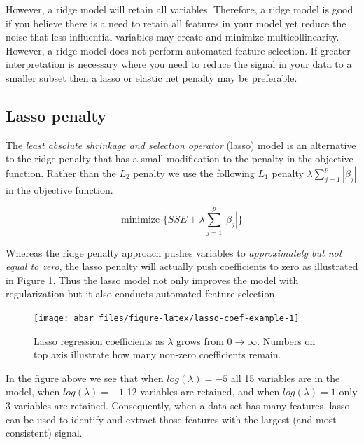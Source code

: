 \documentclass[]{book}
\theoremstyle{definition}
\theoremstyle{definition}
\theoremstyle{definition}
\theoremstyle{remark}
\begin{document}
However, a ridge model will retain all variables. Therefore, a ridge
model is good if you believe there is a need to retain all features in
your model yet reduce the noise that less influential variables may
create and minimize multicollinearity. However, a ridge model does not
perform automated feature selection. If greater interpretation is
necessary where you need to reduce the signal in your data to a smaller
subset then a lasso or elastic net penalty may be preferable.

\hypertarget{lasso}{%
\subsection{Lasso penalty}\label{lasso}}

The \emph{least absolute shrinkage and selection operator} (lasso) model
\citep{tibshirani1996regression} is an alternative to the ridge penalty
that has a small modification to the penalty in the objective function.
Rather than the \(L_2\) penalty we use the following \(L_1\) penalty
\(\lambda \sum^p_{j=1} | \beta_j|\) in the objective function.

\begin{equation}
\label{eq:lasso-penalty}
\text{minimize } \bigg \{ SSE + \lambda \sum^p_{j=1} | \beta_j | \bigg \}
\end{equation}

Whereas the ridge penalty approach pushes variables to
\emph{approximately but not equal to zero}, the lasso penalty will
actually push coefficients to zero as illustrated in Figure
\ref{fig:lasso-coef-example}. Thus the lasso model not only improves the
model with regularization but it also conducts automated feature
selection.

\begin{figure}

{\centering \texttt{[image: abar\_files/figure-latex/lasso-coef-example-1]} 

}

\caption{Lasso regression coefficients as $\lambda$ grows from  $0 \rightarrow \infty$. Numbers on top axis illustrate how many non-zero coefficients remain.}\label{fig:lasso-coef-example}
\end{figure}

In the figure above we see that when \(log(\lambda) = -5\) all 15
variables are in the model, when \(log(\lambda) = -1\) 12 variables are
retained, and when \(log(\lambda) = 1\) only 3 variables are retained.
Consequently, when a data set has many features, lasso can be used to
identify and extract those features with the largest (and most
consistent) signal.
\end{document}
